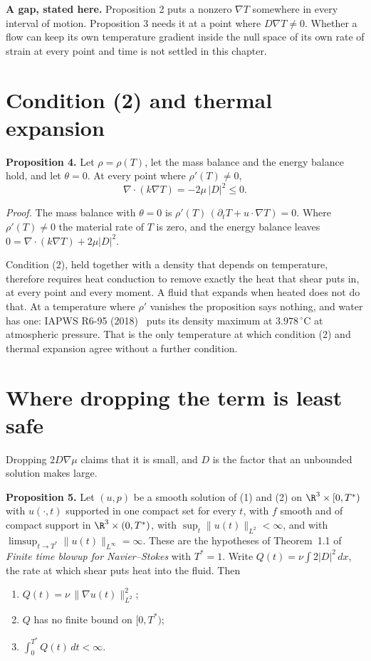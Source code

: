 \textbf{A gap, stated here.} Proposition 2 puts a nonzero $\nabla T$ somewhere in every interval of
motion. Proposition 3 needs it at a point where $D\nabla T \neq 0$. Whether a flow can keep its own
temperature gradient inside the null space of its own rate of strain at every point and time is not
settled in this chapter.

\section{Condition (2) and thermal expansion}

\textbf{Proposition 4.} Let $\rho = \rho(T)$, let the mass balance and the energy balance hold, and
let $\theta = 0$. At every point where $\rho'(T) \neq 0$,
\[
\nabla\cdot(k\nabla T) = -2\mu\,|D|^2 \le 0 .
\]

\emph{Proof.} The mass balance with $\theta = 0$ is $\rho'(T)\,(\partial_t T + u\cdot\nabla T) = 0$.
Where $\rho'(T)\neq 0$ the material rate of $T$ is zero, and the energy balance leaves
$0 = \nabla\cdot(k\nabla T) + 2\mu|D|^2$. \hfill\qedsymbol

Condition (2), held together with a density that depends on temperature, therefore requires heat
conduction to remove exactly the heat that shear puts in, at every point and every moment. A fluid
that expands when heated does not do that. At a temperature where $\rho'$ vanishes the proposition
says nothing, and water has one: IAPWS R6-95 (2018)~\cite{src:IAPWS-R6-95-2018} puts its density maximum at $3.978\,^\circ$C at
atmospheric pressure. That is the only temperature at
which condition (2) and thermal expansion agree without a further condition.

\section{Where dropping the term is least safe}

Dropping $2D\nabla\mu$ claims that it is small, and $D$ is the factor that an unbounded solution
makes large.

\textbf{Proposition 5.} Let $(u,p)$ be a smooth solution of (1) and (2) on $\R^3\times[0,T^*)$ with
$u(\cdot,t)$ supported in one compact set for every $t$, with $f$ smooth and of compact support in
$\R^3\times(0,T^*)$, with $\sup_t\|u(t)\|_{L^2} < \infty$, and with
$\limsup_{t\to T^*}\|u(t)\|_{L^\infty} = \infty$. These are the hypotheses of Theorem~1.1 of
\emph{Finite time blowup for Navier--Stokes} with $T^* = 1$. Write $Q(t) = \nu\int 2|D|^2\,dx$, the
rate at which shear puts heat into the fluid. Then
\begin{enumerate}
\item $Q(t) = \nu\,\|\nabla u(t)\|_{L^2}^2$;
\item $Q$ has no finite bound on $[0,T^*)$;
\item $\int_0^{T^*} Q(t)\,dt < \infty$.
\end{enumerate}


